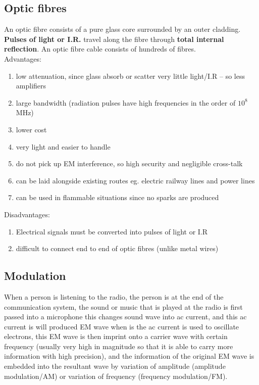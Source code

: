 \documentclass{article}
\begin{document}
\subsection{Optic fibres}

An optic fibre consists of a pure glass core surrounded by an outer cladding. \textbf{Pulses of light or I.R.} travel along the fibre through \textbf{total internal reflection}. An optic fibre cable consists of hundreds of fibres.
\\Advantages:
\begin{enumerate}
    \item low attenuation, since glass absorb or scatter very little light/I.R -- so less amplifiers
    \item large bandwidth (radiation pulses have high frequencies in the order of $10^8$MHz)
    \item lower cost
    \item very light and easier to handle
    \item do not pick up EM interference, so high security and negligible cross-talk
    \item can be laid alongside existing routes eg. electric railway lines and power lines
    \item can be used in flammable situations since no sparks are produced
\end{enumerate}
Disadvantages:
\begin{enumerate}
    \item Electrical signals must be converted into pulses of light or I.R
    \item difficult to connect end to end of optic fibres (unlike metal wires)
\end{enumerate}
\newpage

\subsection{Modulation}

When a person is listening to the radio, the person is at the end of the communication system, the sound or music that is played at the radio is first passed into a microphone this changes sound wave into ac current, and this ac current is will produced EM wave when is the ac current is used to oscillate electrons, this EM wave is then imprint onto a carrier wave with certain frequency (usually very high in magnitude so that it is able to carry more information with high precision), and the information of the original EM wave is embedded into the resultant wave by variation of amplitude (amplitude modulation/AM) or variation of frequency (frequency modulation/FM).
\end{document}
